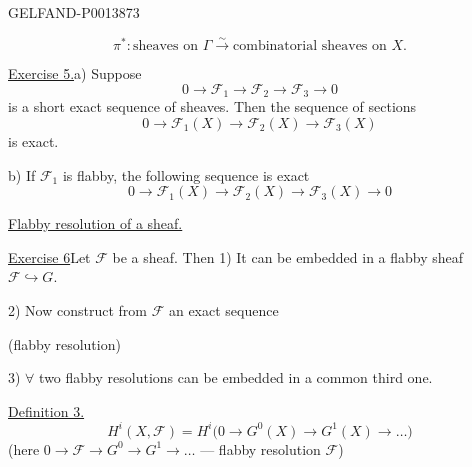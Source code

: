 \begin{GelfandAdjacentEvidence}{GELFAND-P001387}{3}

\[
\pi^*\colon\text{sheaves on }\Gamma\overset{\sim}{\longrightarrow}
\text{combinatorial sheaves on }X.
\]

\uline{Exercise 5.}\quad a) Suppose
\[
0\longrightarrow\mathcal F_1\longrightarrow\mathcal F_2\longrightarrow
\mathcal F_3\longrightarrow0
\]
is a short exact sequence of sheaves. Then the sequence of sections
\[
0\longrightarrow\mathcal F_1(X)\longrightarrow\mathcal F_2(X)
\longrightarrow\mathcal F_3(X)
\]
is exact.

b) If \(\mathcal F_1\) is flabby, the following sequence is exact
\[
0\longrightarrow\mathcal F_1(X)\longrightarrow\mathcal F_2(X)
\longrightarrow\mathcal F_3(X)\longrightarrow0
\]

\uline{Flabby resolution of a sheaf.}

\uline{Exercise 6}\quad Let \(\mathcal F\) be a sheaf. Then 1) It can be embedded in a flabby sheaf
\(\mathcal F\hookrightarrow G\).

2) Now construct from \(\mathcal F\) an exact sequence

\end{GelfandAdjacentEvidence}


(flabby resolution)

3) \(\forall\) two flabby resolutions can be embedded in a common third one.

\uline{Definition 3.}
\[
H^i(X,\mathcal F)=H^i\bigl(0\longrightarrow G^0(X)\longrightarrow
G^1(X)\longrightarrow\ldots\bigr)
\]
(here \(0\longrightarrow\mathcal F\longrightarrow G^0\longrightarrow
G^1\longrightarrow\ldots\) --- flabby resolution \(\mathcal F\))

